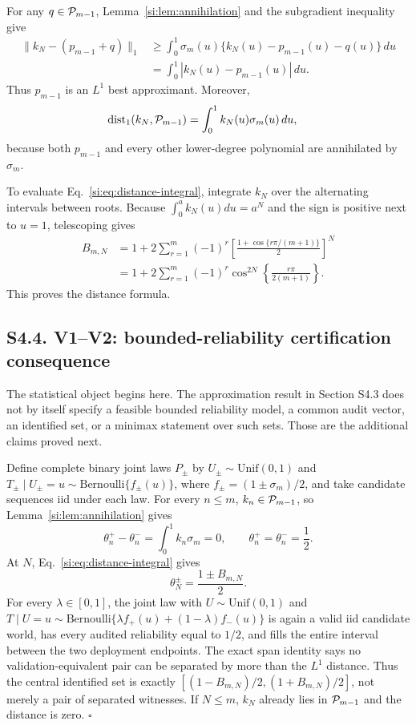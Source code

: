 For any $q\in\mathcal P_{m-1}$, Lemma~\ref{si:lem:annihilation} and the subgradient inequality give
\begin{align}
\|k_N-(p_{m-1}+q)\|_1
&\ge\int_0^1\sigma_m(u)\{k_N(u)-p_{m-1}(u)-q(u)\}\,du\nonumber\\
&=\int_0^1|k_N(u)-p_{m-1}(u)|\,du.
\label{si:eq:l1-optimality}
\end{align}
Thus $p_{m-1}$ is an $L^1$ best approximant. Moreover,
\begin{align}
\operatorname{dist}_1(k_N,\mathcal P_{m-1})
&=\int_0^1k_N(u)\sigma_m(u)\,du,
\label{si:eq:distance-integral}
\end{align}
because both $p_{m-1}$ and every other lower-degree polynomial are annihilated by $\sigma_m$.

To evaluate Eq.~\ref{si:eq:distance-integral}, integrate $k_N$ over the alternating intervals between roots. Because $\int_0^a k_N(u)du=a^N$ and the sign is positive next to $u=1$, telescoping gives
\begin{align}
B_{m,N}
&=1+2\sum_{r=1}^m(-1)^r
\left[\frac{1+\cos\{r\pi/(m+1)\}}2\right]^N\nonumber\\
&=1+2\sum_{r=1}^m(-1)^r
\cos^{2N}\!\left\{\frac{r\pi}{2(m+1)}\right\}.
\label{si:eq:closed-form}
\end{align}
This proves the distance formula.

\subsection*{S4.4. V1--V2: bounded-reliability certification consequence}

The statistical object begins here. The approximation result in Section S4.3 does not by itself specify a feasible bounded reliability model, a common audit vector, an identified set, or a minimax statement over such sets. Those are the additional claims proved next.

Define complete binary joint laws $P_\pm$ by $U_\pm\sim\mathrm{Unif}(0,1)$ and
$T_\pm\mid U_\pm=u\sim\mathrm{Bernoulli}\{f_\pm(u)\}$, where
$f_\pm=(1\pm\sigma_m)/2$, and take candidate sequences iid under each law.
For every $n\le m$, $k_n\in\mathcal P_{m-1}$, so Lemma~\ref{si:lem:annihilation} gives
\begin{equation}
\theta_n^+-\theta_n^-=\int_0^1k_n\sigma_m=0,
\qquad
\theta_n^+=\theta_n^-=\frac12.
\label{si:eq:audit-agreement}
\end{equation}
At $N$, Eq.~\ref{si:eq:distance-integral} gives
\begin{equation}
\theta_N^\pm=\frac{1\pm B_{m,N}}2.
\label{si:eq:deployment-separation}
\end{equation}
For every $\lambda\in[0,1]$, the joint law with $U\sim\mathrm{Unif}(0,1)$ and
$T\mid U=u\sim\mathrm{Bernoulli}\{\lambda f_+(u)+(1-\lambda)f_-(u)\}$ is
again a valid iid candidate world, has every audited reliability equal to
$1/2$, and fills the entire interval between the two deployment endpoints.
The exact span identity says no validation-equivalent pair can be separated
by more than the $L^1$ distance. Thus the central identified set is exactly
$[(1-B_{m,N})/2,(1+B_{m,N})/2]$, not merely a pair of separated witnesses. If
$N\le m$, $k_N$ already lies in $\mathcal P_{m-1}$ and the distance is zero.
\hfill$\square$

